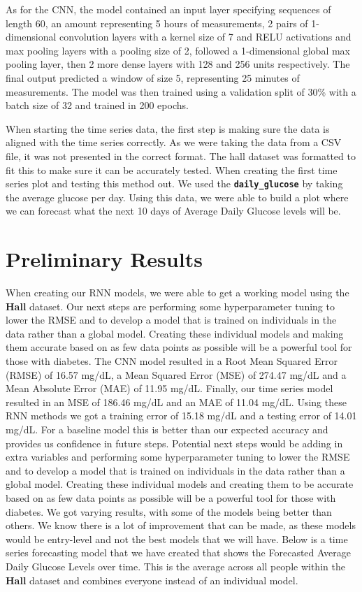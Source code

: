 \documentclass{article}
\begin{document}
As for the CNN, the model contained an input layer specifying sequences of length 60, an amount representing 5 hours of measurements, 2 pairs of 1-dimensional convolution layers with a kernel size of 7 and RELU activations and max pooling layers with a pooling size of 2, followed a 1-dimensional global max pooling layer, then 2 more dense layers with 128 and 256 units respectively. The final output predicted a window of size 5, representing 25 minutes of measurements. The model was then trained using a validation split of 30\% with a batch size of 32 and trained in 200 epochs. 

When starting the time series data, the first step is making sure the data is aligned with the time series correctly. As we were taking the data from a CSV file, it was not presented in the correct format. The hall dataset was formatted to fit this to make sure it can be accurately tested. When creating the first time series plot and testing this method out. We used the \texttt{\textbf{daily\_glucose}} by taking the average glucose per day. Using this data, we were able to build a plot where we can forecast what the next 10 days of Average Daily Glucose levels will be. 

\section*{Preliminary Results}

When creating our RNN models, we were able to get a working model using the \textbf{Hall} dataset. \cite{Blood_Glucose_RNN} Our next steps are performing some hyperparameter tuning to lower the RMSE and to develop a model that is trained on individuals in the data rather than a global model. Creating these individual models and making them accurate based on as few data points as possible will be a powerful tool for those with diabetes. The CNN model resulted in a Root Mean Squared Error (RMSE) of 16.57 mg/dL, a Mean Squared Error (MSE) of 274.47 mg/dL and a Mean Absolute Error (MAE) of 11.95 mg/dL. Finally, our time series model resulted in an MSE of 186.46 mg/dL and an MAE of 11.04 mg/dL.
Using these RNN methods we got a training error of 15.18 mg/dL and a testing error of 14.01 mg/dL. For a baseline model this is better than our expected accuracy and provides us confidence in future steps. Potential next steps would be adding in extra variables and performing some hyperparameter tuning to lower the RMSE and to develop a model that is trained on individuals in the data rather than a global model. Creating these individual models and creating them to be accurate based on as few data points as possible will be a powerful tool for those with diabetes.
We got varying results, with some of the models being better than others. We know there is a lot of improvement that can be made, as these models would be entry-level and not the best models that we will have. Below is a time series forecasting model that we have created that shows the Forecasted Average Daily Glucose Levels over time. This is the average across all people within the \textbf{Hall} dataset \cite{Blood_Glucose_RNN} and combines everyone instead of an individual model. 
\end{document}
